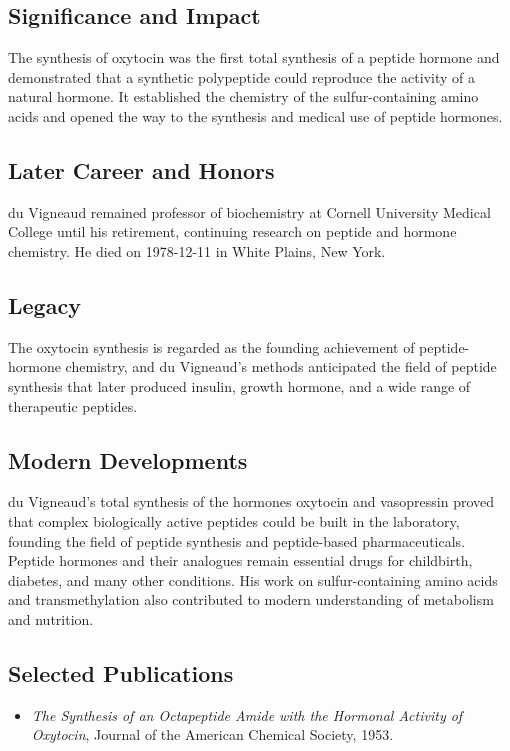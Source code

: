 \subsection*{Significance and Impact}

The synthesis of oxytocin was the first total synthesis of a peptide hormone and demonstrated that a synthetic polypeptide could reproduce the activity of a natural hormone. It established the chemistry of the sulfur-containing amino acids and opened the way to the synthesis and medical use of peptide hormones.

\subsection*{Later Career and Honors}

du Vigneaud remained professor of biochemistry at Cornell University Medical College until his retirement, continuing research on peptide and hormone chemistry. He died on 1978-12-11 in White Plains, New York.

\subsection*{Legacy}

The oxytocin synthesis is regarded as the founding achievement of peptide-hormone chemistry, and du Vigneaud's methods anticipated the field of peptide synthesis that later produced insulin, growth hormone, and a wide range of therapeutic peptides.

\subsection*{Modern Developments}

du Vigneaud's total synthesis of the hormones oxytocin and vasopressin proved that complex biologically active peptides could be built in the laboratory, founding the field of peptide synthesis and peptide-based pharmaceuticals. Peptide hormones and their analogues remain essential drugs for childbirth, diabetes, and many other conditions. His work on sulfur-containing amino acids and transmethylation also contributed to modern understanding of metabolism and nutrition.

\subsection*{Selected Publications}

\begin{itemize}

\item \emph{The Synthesis of an Octapeptide Amide with the Hormonal Activity of Oxytocin}, Journal of the American Chemical Society, 1953.

\end{itemize}

